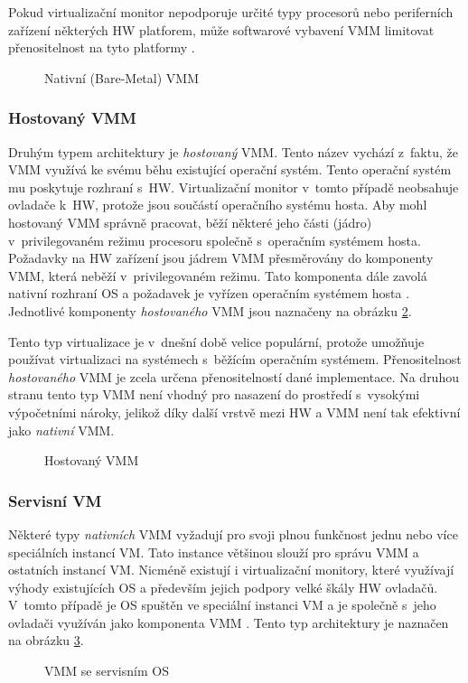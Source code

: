 Pokud virtualizační monitor nepodporuje určité typy procesorů nebo periferních zařízení některých HW platforem, může softwarové
vybavení VMM limitovat přenositelnost na tyto platformy \cite{cvut:presentation:virt1}.
\begin{figure}
    \centering    
    \caption{Nativní (Bare-Metal) VMM}
    \label{figure:native_vmm}
\end{figure}
\subsubsection{Hostovaný VMM}
\label{chapter:virtualization:vmm:types:hosted}
Druhým typem architektury je \textit{hostovaný} VMM. Tento název vychází z~faktu, že VMM využívá ke svému běhu existující operační
systém. Tento operační systém mu poskytuje rozhraní s~HW. Virtualizační monitor v~tomto případě neobsahuje ovladače k~HW,
protože jsou součástí operačního systému hosta. Aby mohl hostovaný VMM správně pracovat, běží některé jeho části (jádro)
v~privilegovaném režimu procesoru společně s~operačním systémem hosta. Požadavky na HW zařízení jsou jádrem VMM přesměrovány
do komponenty VMM, která neběží v~privilegovaném režimu. Tato komponenta dále zavolá nativní rozhraní OS a požadavek je 
vyřízen operačním systémem hosta \cite{cvut:presentation:virt1}. Jednotlivé komponenty \textit{hostovaného} VMM jsou naznačeny na 
obrázku \ref{figure:hosted_vmm}.

Tento typ virtualizace je v~dnešní době velice populární, protože umožňuje používat virtualizaci na systémech s~běžícím operačním 
systémem. Přenositelnost \textit{hostovaného} VMM je zcela určena přenositelností dané implementace. Na druhou stranu tento
typ VMM není vhodný pro nasazení do prostředí s~vysokými výpočetními nároky, jelikož díky další vrstvě mezi HW a VMM není tak
efektivní jako \textit{nativní} VMM.
\begin{figure}
    \centering    
    \caption{Hostovaný VMM}
    \label{figure:hosted_vmm}
\end{figure}
\subsubsection{Servisní VM}
\label{chapter:virtualization:vmm:types:servise}
Některé typy \textit{nativních} VMM vyžadují pro svoji plnou funkčnost jednu nebo více speciálních instancí VM. Tato instance
většinou slouží pro správu VMM a ostatních instancí VM. Nicméně existují i virtualizační monitory, které využívají výhody
existujících OS a především jejich podpory velké škály HW ovladačů. V~tomto případě je OS spuštěn ve speciální instanci VM
a je společně s~jeho ovladači využíván jako komponenta VMM \cite{cvut:presentation:virt1}. Tento typ architektury je naznačen
na obrázku \ref{figure:servise_vmm}.
\begin{figure}
    \centering    
    \caption{VMM se servisním OS}
    \label{figure:servise_vmm}
\end{figure}